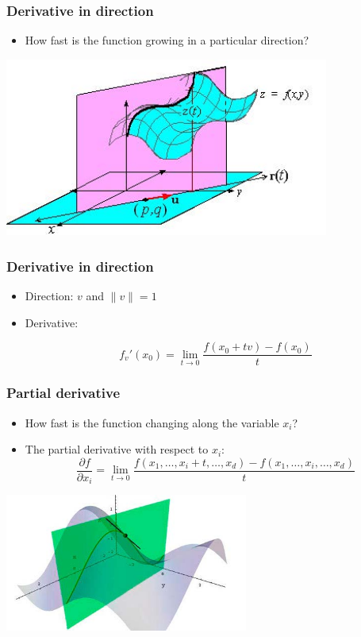 \documentclass[default]{beamer}
\begin{document}
	\begin{frame}
		\frametitle{Derivative in direction}
		
		\begin{itemize}
			\item How fast is the function growing in a particular direction?
		\end{itemize}
		
		\centering
		\includegraphics[width=0.8\textwidth]{linear_14.jpg}
	\end{frame}

	\begin{frame}
		\frametitle{Derivative in direction}
		
		\Large
		\begin{itemize}
			\item Direction: $v$ and $\|v\|=1$
			\item Derivative:
			
			\[
				f_v'(x_0)=\lim_{t\rightarrow 0}\frac{f(x_0+tv)-f(x_0)}{t}
			\]
		\end{itemize}
		
	\end{frame}


	\begin{frame}
		\frametitle{Partial derivative}
		
		\begin{itemize}
			\item How fast is the function changing along the variable $x_i$?
			\item The partial derivative with respect to $x_i$:
			\[
				\frac{\partial f}{\partial x_i}=\lim_{t\rightarrow 0}\frac{f(x_1,\dots,x_i+t,\dots,x_d)-f(x_1,\dots,x_i,\dots,x_d)}{t}
			\]
		\end{itemize}
		
		\centering
		\includegraphics[width=0.6\textwidth]{linear_15.jpg}
	\end{frame}
\end{document}
